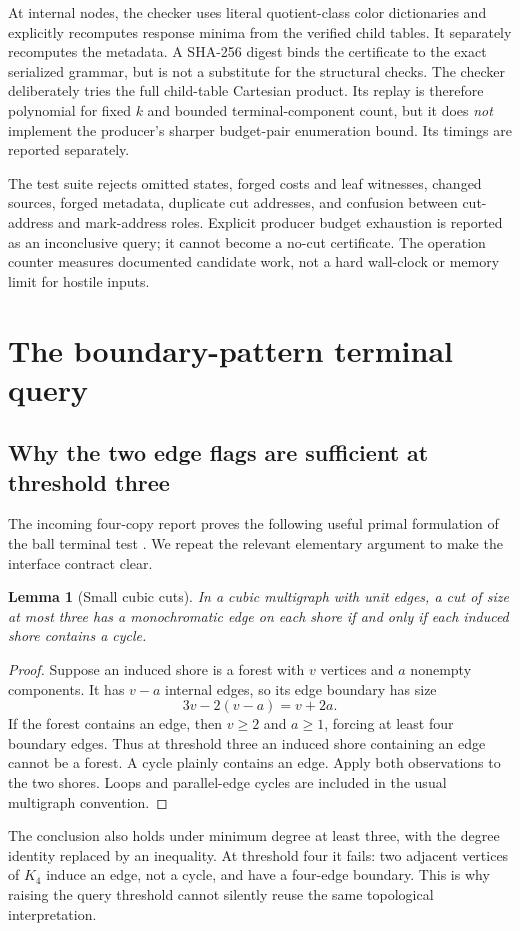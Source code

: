 \documentclass[11pt,a4paper]{article}
\newtheorem{lemma}[theorem]{Lemma}
\theoremstyle{definition}
\theoremstyle{remark}
\begin{document}
At internal nodes, the checker uses literal quotient-class color dictionaries and explicitly recomputes response minima from the verified child tables. It separately recomputes the metadata. A SHA-256 digest binds the certificate to the exact serialized grammar, but is not a substitute for the structural checks. The checker deliberately tries the full child-table Cartesian product. Its replay is therefore polynomial for fixed $k$ and bounded terminal-component count, but it does \emph{not} implement the producer's sharper budget-pair enumeration bound. Its timings are reported separately.

The test suite rejects omitted states, forged costs and leaf witnesses, changed sources, forged metadata, duplicate cut addresses, and confusion between cut-address and mark-address roles. Explicit producer budget exhaustion is reported as an inconclusive query; it cannot become a no-cut certificate. The operation counter measures documented candidate work, not a hard wall-clock or memory limit for hostile inputs.

\section{The boundary-pattern terminal query}
\label{sec:topology}
\subsection{Why the two edge flags are sufficient at threshold three}
The incoming four-copy report proves the following useful primal formulation of the ball terminal test \cite{fourcopy}. We repeat the relevant elementary argument to make the interface contract clear.

\begin{lemma}[Small cubic cuts]
\label{lem:cubic}
In a cubic multigraph with unit edges, a cut of size at most three has a monochromatic edge on each shore if and only if each induced shore contains a cycle.
\end{lemma}
\begin{proof}
Suppose an induced shore is a forest with $v$ vertices and $a$ nonempty components. It has $v-a$ internal edges, so its edge boundary has size
\[
 3v-2(v-a)=v+2a.
\]
If the forest contains an edge, then $v\ge2$ and $a\ge1$, forcing at least four boundary edges. Thus at threshold three an induced shore containing an edge cannot be a forest. A cycle plainly contains an edge. Apply both observations to the two shores. Loops and parallel-edge cycles are included in the usual multigraph convention.
\end{proof}
The conclusion also holds under minimum degree at least three, with the degree identity replaced by an inequality. At threshold four it fails: two adjacent vertices of $K_4$ induce an edge, not a cycle, and have a four-edge boundary. This is why raising the query threshold cannot silently reuse the same topological interpretation.
\end{document}
